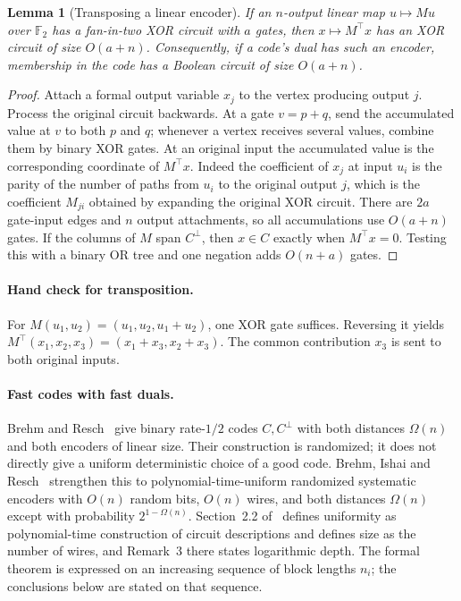 \documentclass[11pt]{article}
\newtheorem{lemma}[theorem]{Lemma}
\theoremstyle{definition}
\theoremstyle{remark}
\begin{document}
\begin{lemma}[Transposing a linear encoder]
\label{lem:transpose-parity}
If an $n$-output linear map $u\mapsto Mu$ over $\mathbb F_2$ has a
fan-in-two XOR circuit with $a$ gates, then $x\mapsto M^\top x$ has
an XOR circuit of size $O(a+n)$.  Consequently, if a code's dual
has such an encoder, membership in the code has a Boolean circuit
of size $O(a+n)$.
\end{lemma}
\begin{proof}
Attach a formal output variable $x_j$ to the vertex producing output
$j$.  Process the original circuit backwards.  At a gate $v=p+q$,
send the accumulated value at $v$ to both $p$ and $q$; whenever a
vertex receives several values, combine them by binary XOR gates.
At an original input the accumulated value is the corresponding
coordinate of $M^\top x$.
Indeed the coefficient of $x_j$ at input $u_i$ is the parity of the
number of paths from $u_i$ to the original output $j$, which is the
coefficient $M_{ji}$ obtained by expanding the original XOR circuit.
There are $2a$ gate-input edges and $n$ output attachments, so all
accumulations use $O(a+n)$ gates.
If the columns of $M$ span $C^\perp$, then $x\in C$ exactly when
$M^\top x=0$.  Testing this with a binary OR tree and one negation
adds $O(n+a)$ gates.
\end{proof}

\paragraph{Hand check for transposition.}
For $M(u_1,u_2)=(u_1,u_2,u_1+u_2)$, one XOR gate suffices.
Reversing it yields $M^\top(x_1,x_2,x_3)=(x_1+x_3,x_2+x_3)$.
The common contribution $x_3$ is sent to both original inputs.

\paragraph{Fast codes with fast duals.}
Brehm and Resch~\cite[Theorem~2]{BR26} give binary rate-$1/2$ codes
$C,C^\perp$ with both distances $\Omega(n)$ and both encoders of
linear size.  Their construction is randomized; it does not directly
give a uniform deterministic choice of a good code.
Brehm, Ishai and Resch~\cite[Theorem~9]{BIR26} strengthen this to
polynomial-time-uniform randomized systematic encoders with $O(n)$
random bits, $O(n)$ wires, and both distances $\Omega(n)$ except with
probability $2^{1-\Omega(n)}$.
Section~2.2 of~\cite{BIR26} defines uniformity as polynomial-time
construction of circuit descriptions and defines size as the number of
wires, and Remark~3 there states logarithmic depth.
The formal theorem is expressed on an increasing sequence of block
lengths $n_i$; the conclusions below are stated on that sequence.
\end{document}
